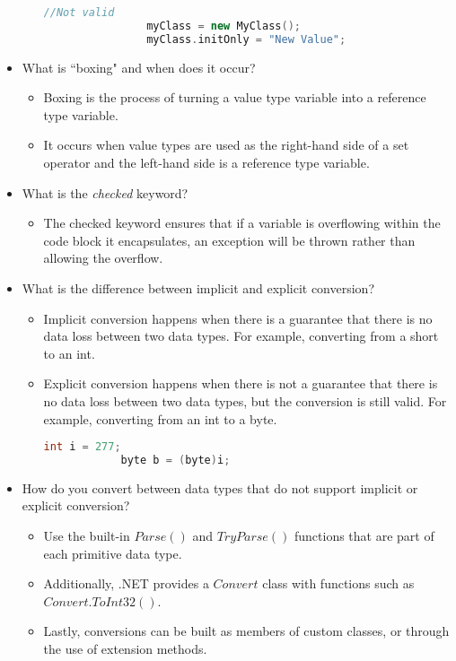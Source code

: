 \documentclass{article}
\begin{document}
\begin{itemize}
\begin{itemize}
\begin{lstlisting}[language=C++]
                //Not valid
                myClass = new MyClass();
                myClass.initOnly = "New Value";
                \end{lstlisting}
    \end{itemize}\item What is ``boxing" and when does it occur?
    \begin{itemize}
        \item Boxing is the process of turning a value type variable into a reference type variable.
        \item It occurs when value types are used as the right-hand side of a set operator and the left-hand side is a reference type variable.
    \end{itemize}
    \item What is the \textit{checked} keyword?
    \begin{itemize}
        \item The checked keyword ensures that if a variable is overflowing within the code block it encapsulates, an exception will be thrown rather than allowing the overflow.
    \end{itemize}
    \item What is the difference between implicit and explicit conversion?
    \begin{itemize}
        \item Implicit conversion happens when there is a guarantee that there is no data loss between two data types. For example, converting from a short to an int.
        \item Explicit conversion happens when there is not a guarantee that there is no data loss between two data types, but the conversion is still valid. For example, converting from an int to a byte.
        \begin{lstlisting}[language=C++]
            int i = 277;
            byte b = (byte)i;\end{lstlisting}
    \end{itemize}
    \item How do you convert between data types that do not support implicit or explicit conversion?
    \begin{itemize}
        \item Use the built-in $Parse()$ and $TryParse()$ functions that are part of each primitive data type.
        \item Additionally, .NET provides a $Convert$ class with functions such as $Convert.ToInt32()$.
        \item Lastly, conversions can be built as members of custom classes, or through the use of extension methods.
    \end{itemize}
\end{itemize}
\end{document}
